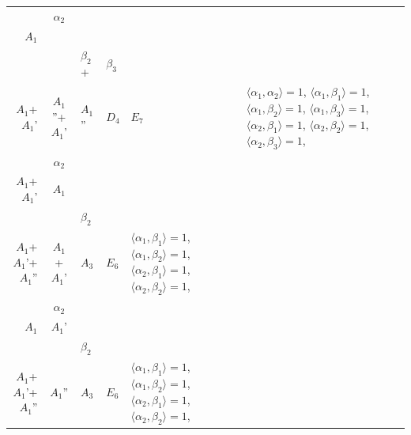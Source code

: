 \documentclass[12pt]{report}
\begin{document}
\begin{appendix}
{\begin{longtable}{rcl p{1cm}p{1cm}p{3cm} }
\\
\begin{tabular}{cc}$\alpha_1$+ & $\alpha_2$\\\tiny{ $A_1$ } & \tiny{  }\end{tabular} &\begin{tabular}{c} = \\~ \end{tabular} & \begin{tabular}{ccc}$\beta_1$+ & $\beta_2$+ & $\beta_3$\\\tiny{ $A_1$+$A_1$' } & \tiny{ $A_1$''+$A_1$' } & \tiny{ $A_1$'' }\end{tabular} & $D_4$ & $E_7$ & $\langle\alpha_1, \alpha_2\rangle=1$,  $\langle\alpha_1, \beta_1\rangle=1$, $\langle\alpha_1, \beta_2\rangle=1$, $\langle\alpha_1, \beta_3\rangle=1$, $\langle\alpha_2, \beta_1\rangle=1$, $\langle\alpha_2, \beta_2\rangle=1$, $\langle\alpha_2, \beta_3\rangle=1$, 
\\
\begin{tabular}{cc}$\alpha_1$+ & $\alpha_2$\\\tiny{ $A_1$+$A_1$' } & \tiny{ $A_1$ }\end{tabular} &\begin{tabular}{c} = \\~ \end{tabular} & \begin{tabular}{cc}$\beta_1$+ & $\beta_2$\\\tiny{ $A_1$+$A_1$'+$A_1$'' } & \tiny{ $A_1$+$A_1$' }\end{tabular} & $A_3$ & $E_6$ &  $\langle\alpha_1, \beta_1\rangle=1$, $\langle\alpha_1, \beta_2\rangle=1$, $\langle\alpha_2, \beta_1\rangle=1$, $\langle\alpha_2, \beta_2\rangle=1$, 
\\
\begin{tabular}{cc}$\alpha_1$+ & $\alpha_2$\\\tiny{ $A_1$ } & \tiny{ $A_1$' }\end{tabular} &\begin{tabular}{c} = \\~ \end{tabular} & \begin{tabular}{cc}$\beta_1$+ & $\beta_2$\\\tiny{ $A_1$+$A_1$'+$A_1$'' } & \tiny{ $A_1$'' }\end{tabular} & $A_3$ & $E_6$ &  $\langle\alpha_1, \beta_1\rangle=1$, $\langle\alpha_1, \beta_2\rangle=1$, $\langle\alpha_2, \beta_1\rangle=1$, $\langle\alpha_2, \beta_2\rangle=1$, 
\\

\end{longtable}}
\end{appendix}
\end{document}
